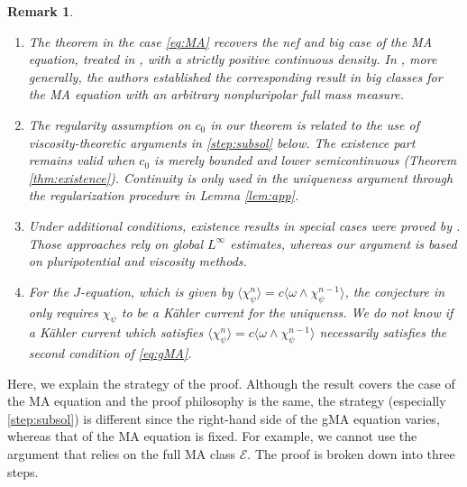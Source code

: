 \documentclass[10pt,a4paper]{amsart}
\numberwithin{equation}{section}
\newtheorem{remark}[equation]{Remark}
\begin{document}
\begin{remark}\label{rem:main}
    \begin{enumerate}[label={\upshape(\roman*)}]
        \item The theorem in the case \eqref{eq:MA} recovers the nef and big case of the MA equation, treated in \cite{BEGZ}, with a strictly positive continuous density. 
        In \cite{BEGZ}, more generally, the authors established the corresponding result in big classes for the MA equation with an arbitrary nonpluripolar full mass measure. 
        \item The regularity assumption on $c_0$ in our theorem is related to the use of viscosity-theoretic arguments in \ref{step:subsol} below. 
        The existence part remains valid when $c_0$ is merely bounded and lower semicontinuous (Theorem \ref{thm:existence}). Continuity is only used in the uniqueness argument through the regularization procedure in Lemma \ref{lem:app}.
        \item Under additional conditions, existence results in special cases were proved by \cite{FL,DMS,Sun23,To,GS}. Those approaches rely on global $L^\infty$ estimates, whereas our argument is based on pluripotential and viscosity methods.
        \item\label{item:DMS} For the $J$-equation, which is given by $\langle
        \chi_\psi^n\rangle=c\langle\omega\wedge\chi_\psi^{n-1}\rangle$, the conjecture in \cite[Conjecture 1.2]{DMS} only requires $\chi_\psi$ to be a Kähler current for the uniquenss.
        We do not know if a Kähler current which satisfies $\langle
        \chi_\psi^n\rangle=c\langle\omega\wedge\chi_\psi^{n-1}\rangle$ necessarily satisfies the second condition of \eqref{eq:gMA}.
    \end{enumerate}
\end{remark}

Here, we explain the strategy of the proof. Although the result covers the case of the MA equation and the proof philosophy is the same, the strategy (especially \ref{step:subsol}) is different since the right-hand side of the gMA equation varies, whereas that of the MA equation is fixed. For example, we cannot use the argument that relies on the full MA class $\mathcal{E}$. 
The proof is broken down into three steps. 
\end{document}
